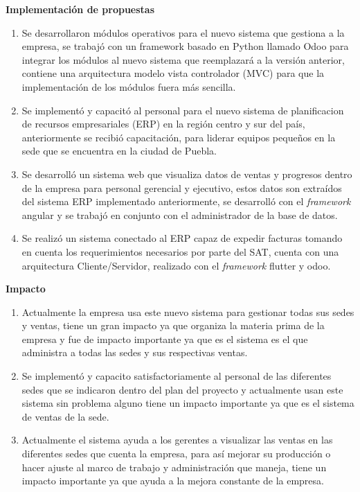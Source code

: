 \documentclass[protocolo.tex]{subfiles}
\begin{document}
\textbf{Implementación de propuestas}
\begin{enumerate}
\item Se desarrollaron módulos operativos para el nuevo sistema que gestiona a la empresa, se
trabajó con un framework basado en Python llamado Odoo para integrar los módulos al
nuevo sistema que reemplazará a la versión anterior, contiene una arquitectura modelo vista controlador (MVC) para
que la implementación de los módulos fuera más sencilla.


\item Se implementó y capacitó al personal para el nuevo sistema de planificacion de recursos empresariales (ERP) en la región centro y
sur del país, anteriormente se recibió capacitación, para liderar equipos pequeños en la sede
que se encuentra en la ciudad de Puebla.


\item Se desarrolló un sistema web que visualiza datos de ventas y progresos dentro de la
empresa para personal gerencial y ejecutivo, estos datos son extraídos del sistema ERP
implementado anteriormente, se desarrolló con el \textit{framework} angular y se trabajó en
conjunto con el administrador de la base de datos.

\item Se realizó un sistema conectado al ERP capaz de expedir facturas tomando en cuenta
los requerimientos necesarios por parte del SAT, cuenta con una arquitectura
Cliente/Servidor, realizado con el \textit{framework} flutter y odoo.


\end{enumerate}

\textbf{Impacto}
\begin{enumerate}
\item Actualmente la empresa usa este nuevo sistema para gestionar todas sus sedes y ventas,
tiene un gran impacto ya que organiza la materia prima de la empresa y fue de impacto
importante ya que es el sistema es el que administra a todas las sedes y sus respectivas
ventas.

\item Se implementó y capacito satisfactoriamente al personal de las diferentes sedes que se
indicaron dentro del plan del proyecto y actualmente usan este sistema sin problema alguno
tiene un impacto importante ya que es el sistema de ventas de la sede.

\item Actualmente el sistema ayuda a los gerentes a visualizar las ventas en las diferentes
sedes que cuenta la empresa, para así mejorar su producción o hacer ajuste al marco de
trabajo y administración que maneja, tiene un impacto importante ya que ayuda a la mejora
constante de la empresa.



\end{enumerate}
\end{document}
